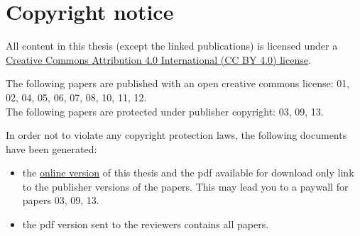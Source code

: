 \section*{Copyright notice}

All content in this thesis (except the linked publications) is licensed 
under a \href{https://creativecommons.org/licenses/by/4.0}{Creative Commons Attribution 4.0 International (CC BY 4.0) license}.

The following papers are published with an open creative commons license:
01, 02, 04, 05, 06, 07, 08, 10, 11, 12. \\
The following papers are protected under publisher copyright: 03, 09, 13.

In order not to violate any copyright protection laws, the following documents have been generated:
\begin{itemize}[nosep]
\item the \href{https://fabienmaussion.info/habil2.0}{online version} of this thesis and the pdf available for download only link to the publisher 
      versions of the papers. This may lead you to a paywall for papers 03, 09, 13.
\item the pdf version sent to the reviewers contains all papers.
\end{itemize}
